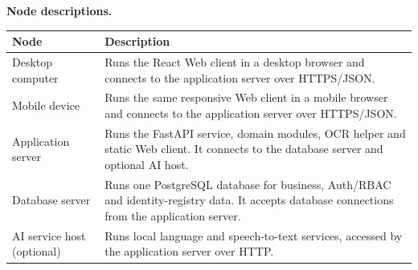 \documentclass[10pt,letterpaper]{article}
\newenvironment{updated}{\par\color{pafourblue}}{\par}
\begin{document}
\begin{updated}
\clearpage
\noindent\textbf{Node descriptions.}\par\smallskip
\begingroup\small
\begin{tabularx}{\textwidth}{|L{3.3cm}|Y|}
\hline
\textbf{Node} & \textbf{Description} \\ \hline
Desktop computer & Runs the React Web client in a desktop browser and connects to
the application server over HTTPS/JSON. \\ \hline
Mobile device & Runs the same responsive Web client in a mobile browser and
connects to the application server over HTTPS/JSON. \\ \hline
Application server & Runs the FastAPI service, domain modules, OCR helper and
static Web client. It connects to the database server and optional AI host. \\ \hline
Database server & Runs one PostgreSQL database for business, Auth/RBAC and identity-registry data. It accepts
database connections from the application server. \\ \hline
AI service host (optional) & Runs local language and speech-to-text services,
accessed by the application server over HTTP. \\ \hline
\end{tabularx}
\endgroup
\end{updated}

\clearpage
\end{document}
